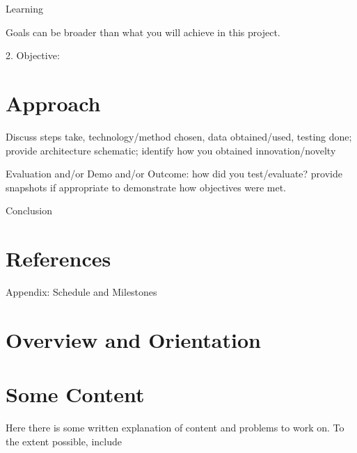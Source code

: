 \documentclass[10pt]{article}
\begin{document}
Learning 

Goals can be broader than what you will achieve in this project.


2. Objective: 

\section{Approach} Discuss steps take, technology/method chosen, data obtained/used, testing done; provide architecture schematic; identify how you obtained innovation/novelty

Evaluation and/or Demo and/or Outcome: how did you test/evaluate? provide snapshots if appropriate to demonstrate how objectives were met.

Conclusion

\section{References}


Appendix: Schedule and Milestones


\section{Overview and Orientation}



\section{Some Content}

Here there is some written explanation of content and problems to work on. To the extent possible, include



\end{document}
